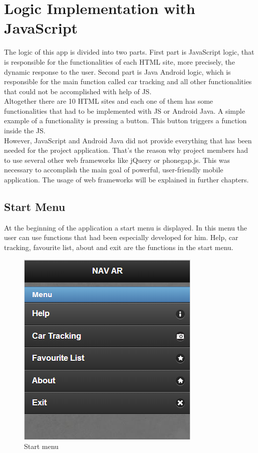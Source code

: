 \chapter{Logic Implementation with JavaScript} \label{chapter:desgin}

The logic of this app is divided into two parts. First part is JavaScript logic, that is responsible for the functionalities of each HTML site, more precisely, the dynamic response to the user. Second part is Java Android logic, which is responsible for the main function called car tracking and all other functionalities that could not be accomplished with help of JS. 
\\

Altogether there are 10 HTML sites and each one of them has some functionalities that had to be implemented with JS or Android Java. A simple example of a functionality is pressing a button. This button triggers a function inside the JS. 
\\

However, JavaScript and Android Java did not provide everything that has been needed for the project application. That's the reason why project members had to use several other web frameworks like jQuery or phonegap.js. This was necessary to accomplish the main goal of powerful, user-friendly mobile application. The usage of web frameworks will be explained in further chapters. 

\section{Start Menu}
At the beginning of the application a start menu is displayed. In this menu the user can use functions that had been especially developed for him. Help, car tracking, favourite list, about and exit are the functions in the start menu.
\\

\begin{figure}
\centering
\includegraphics[width=0.5\linewidth]{graphics/chapter4/1}
\caption{Start menu}
\label{fig:1}
\end{figure}
\newpage

